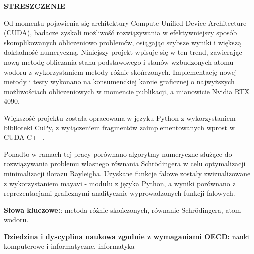 \noindent
\begingroup
\fontsize{12pt}{1.5pt}\selectfont
\textbf{STRESZCZENIE}
\endgroup

\vspace{3mm}

Od momentu pojawienia się architektury Compute Unified Device Architecture (CUDA), badacze zyskali możliwość rozwiązywania w efektywniejszy sposób skomplikowanych obliczeniowo problemów, osiągając szybsze wyniki i większą dokładność numeryczną. Niniejszy projekt wpisuje się w ten trend, zawierając nową metodę obliczania stanu podstawowego i stanów wzbudzonych atomu wodoru z wykorzystaniem metody różnic skończonych. Implementację nowej metody i testy wykonano na konsumenckiej karcie graficznej o najwyższych możliwościach obliczeniowych w momencie publikacji, a mianowicie Nvidia RTX 4090.

Większość projektu została opracowana w języku Python z wykorzystaniem biblioteki CuPy, z wyłączeniem fragmentów zaimplementowanych wprost w CUDA C++.

Ponadto w ramach tej pracy porównano algorytmy numeryczne służące do rozwiązywania problemu własnego równania Schr{\"o}dingera w celu optymalizacji minimalizacji ilorazu Rayleigha. Uzyskane funkcje falowe zostały zwizualizowane z wykorzystaniem mayavi - modułu z języka Python, a wyniki porównano z reprezentacjami graficznymi analitycznie wyprowadzonych funkcji falowych.

\textbf{Słowa kluczowe:}: metoda różnic skończonych, równanie Schrödingera, atom wodoru.

\textbf{Dziedzina i dyscyplina naukowa zgodnie z wymaganiami OECD:}
nauki komputerowe i informatyczne, informatyka